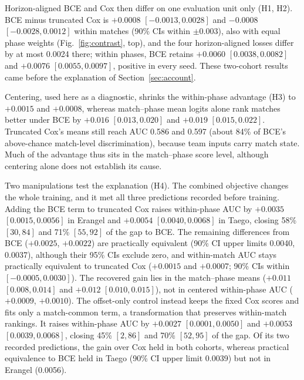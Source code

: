 \documentclass[sigconf,anonymous,nonacm]{acmart}
\begin{document}
Horizon-aligned BCE and Cox then differ on one evaluation unit only (H1, H2). BCE minus truncated Cox is $+0.0008$ $[-0.0013,\allowbreak 0.0028]$ and $-0.0008$ $[-0.0028,\allowbreak 0.0012]$ within matches (90\% CIs within $\pm0.003$), also with equal phase weights (Fig.~\ref{fig:contrast}, top), and the four horizon-aligned losses differ by at most 0.0024 there; within phases, BCE retains $+0.0060$ $[0.0038,\allowbreak 0.0082]$ and $+0.0076$ $[0.0055,\allowbreak 0.0097]$, positive in every seed. These two-cohort results came before the explanation of Section~\ref{sec:account}.

Centering, used here as a diagnostic, shrinks the within-phase advantage (H3) to $+0.0015$ and $+0.0008$, whereas match--phase mean logits alone rank matches better under BCE by $+0.016$ $[0.013,\allowbreak 0.020]$ and $+0.019$ $[0.015,\allowbreak 0.022]$. Truncated Cox's means still reach AUC 0.586 and 0.597 (about 84\% of BCE's above-chance match-level discrimination), because team inputs carry match state. Much of the advantage thus sits in the match--phase score level, although centering alone does not establish its cause.

Two manipulations test the explanation (H4). The combined objective changes the whole training, and it met all three predictions recorded before training. Adding the BCE term to truncated Cox raises within-phase AUC by $+0.0035$ $[0.0015,\allowbreak 0.0056]$ in Erangel and $+0.0054$ $[0.0040,\allowbreak 0.0068]$ in Taego, closing 58\% $[30,\allowbreak 84]$ and 71\% $[55,\allowbreak 92]$ of the gap to BCE. The remaining differences from BCE ($+0.0025$, $+0.0022$) are practically equivalent (90\% CI upper limits 0.0040, 0.0037), although their 95\% CIs exclude zero, and within-match AUC stays practically equivalent to truncated Cox ($+0.0015$ and $+0.0007$; 90\% CIs within $[-0.0005,\allowbreak 0.0030]$). The recovered gain lies in the match--phase means ($+0.011$ $[0.008,\allowbreak 0.014]$ and $+0.012$ $[0.010,\allowbreak 0.015]$), not in centered within-phase AUC ($+0.0009$, $+0.0010$). The offset-only control instead keeps the fixed Cox scores and fits only a match-common term, a transformation that preserves within-match rankings. It raises within-phase AUC by $+0.0027$ $[0.0001,\allowbreak 0.0050]$ and $+0.0053$ $[0.0039,\allowbreak 0.0068]$, closing 45\% $[2,\allowbreak 86]$ and 70\% $[52,\allowbreak 95]$ of the gap. Of its two recorded predictions, the gain over Cox held in both cohorts, whereas practical equivalence to BCE held in Taego (90\% CI upper limit 0.0039) but not in Erangel (0.0056).
\end{document}
